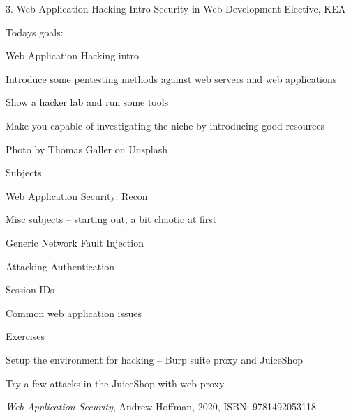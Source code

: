 \documentclass[Screen16to9,17pt]{foils}
\begin{document}
\mytitlepage
{3. Web Application Hacking Intro}
{Security in Web Development Elective, KEA}



Todays goals:
\begin{list2}
\item Web Application Hacking intro
\item Introduce some pentesting methods against web servers and web applications
\item Show a hacker lab and run some tools
\item Make you capable of investigating the niche by introducing good resources
\end{list2}

{\small   Photo by Thomas Galler on Unsplash}



\begin{list1}
\item Subjects
\item Web Application Security: Recon
\item Misc subjects -- starting out, a bit chaotic at first
\begin{list2}
\item Generic Network Fault Injection
\item Attacking Authentication
\item Session IDs
\item Common web application issues
\end{list2}
\item Exercises
\begin{list2}
\item Setup the environment for hacking -- Burp suite proxy and JuiceShop     
\item  Try a few attacks in the JuiceShop with web proxy
\end{list2}
\end{list1}


\emph{Web Application Security}, Andrew Hoffman, 2020, ISBN: 9781492053118
\end{document}
